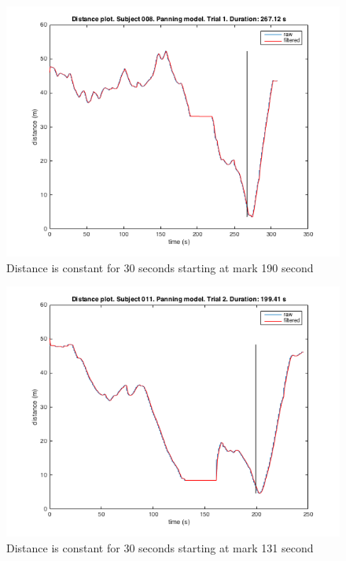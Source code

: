 \documentclass[journal]{IEEEtran}
\begin{document}
\begin{appendices}
\setlength{\abovecaptionskip}{15pt plus 3pt minus 2pt} %


\begin{figure}[h!]
  \centering
    \includegraphics[scale=0.5]{graphics/subject008panningtrial1.png}
  \caption{Distance is constant for 30 seconds starting at mark 190 second}
  \label{fig:plt4}
\end{figure}

\begin{figure}[h!]
  \centering
    \includegraphics[scale=0.5]{graphics/subject011panningtrial2.png}
  \caption{Distance is constant for 30 seconds starting at mark 131 second}
  \label{fig:plt15}
\end{figure}


\end{appendices}
\end{document}
